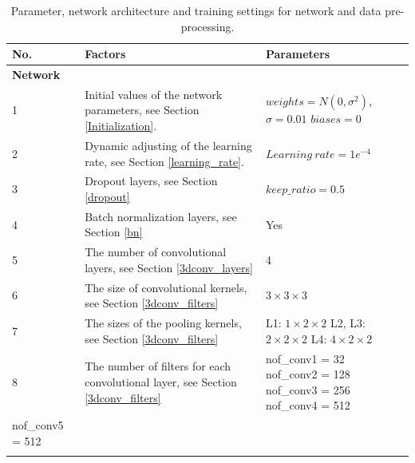   \renewcommand\arraystretch{1.2}  
\begin{table}
	\caption{Parameter, network architecture and training settings for network and data pre-processing.}
	\begin{center}
		\begin{tabular}{| m{0.6cm} | m{7cm} | m{6cm} |}
			\hline
			\textbf{No.} & \textbf{Factors} & \textbf{Parameters}  \\ \hline \hline
			\multicolumn{3}{|l|}{\textbf{Network}}  \\ \hline
			
			1 & Initial values of the network parameters, see Section \ref{Initialization}. & \tabincell{l} 
			{\(weights = N(0,\sigma^2)\), \(\sigma = 0.01\) \\ 
				\(biases = 0 \)} \\ \hline
			
			2 & Dynamic adjusting of the learning rate, see Section \ref{learning_rate}. & \(Learning\ rate = 1e^{-4} \)	\\ \hline
			
			3 & Dropout layers, see Section \ref{dropout} & \(keep\_ratio = 0.5\)	\\ \hline
			
			4 & Batch normalization layers, see Section \ref{bn} &  Yes  \\ \hline
			
			5 & The number of convolutional layers, see Section \ref{3dconv_layers} & 4\\ \hline
			
			6 & The size of convolutional kernels, see Section \ref{3dconv_filters} & \(3 \times 3 \times 3\) \\ \hline
			
			7 & The sizes of the pooling kernels, see Section \ref{3dconv_filters} & \tabincell{l}
			{L1: \(1 \times 2 \times 2 \) \\ 
				L2, L3: \(2 \times 2 \times 2 \) \\
				L4: \(4 \times 2 \times 2 \)}   \\ \hline
			
			8 &  The number of filters for each convolutional layer, see Section \ref{3dconv_filters} &  \tabincell{l}
			{nof\_conv1 = 32 \\ 
				nof\_conv2 = 128  \\
				nof\_conv3 = 256  \\
				nof\_conv4 = 512} \\
			    nof\_conv5 = 512  \\ \hline}
			

\end{tabular}
\end{center}
\end{table}
